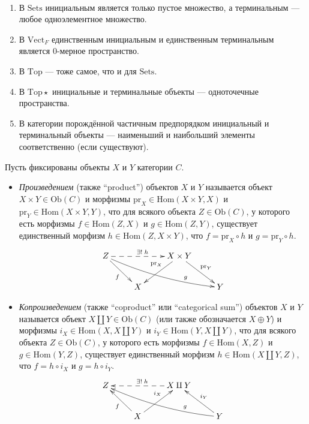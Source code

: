 \documentclass[12pt,a4paper]{article}
\newcommand{\Hom}{\mathrm{Hom}}
\newcommand{\Ob}{\mathrm{Ob}}
\newcommand{\Sets}{\mathrm{Sets}}
\newcommand{\Vect}{\mathrm{Vect}}
\newcommand{\Top}{\mathrm{Top}}
\newcommand{\Topstar}{\mathrm{Top\star}}
\newcommand{\pr}{\mathrm{pr}}
\begin{document}
    \begin{example}\ 
        \begin{enumerate}
            \item В $\Sets$ инициальным является только пустое множество, а терминальным --- любое одноэлементное множество.
            \item В $\Vect_F$ единственным инициальным и единственным терминальным является $0$-мерное пространство.
            \item В $\Top$ --- тоже самое, что и для $\Sets$.
            \item В $\Topstar$ инициальные и терминальные объекты --- одноточечные пространства.
            \item В категории порождённой частичным предпорядком инициальный и терминальный объекты --- наименьший и наибольший элементы соответственно (если существуют).
        \end{enumerate}
    \end{example}

    \begin{definition}
        Пусть фиксированы объекты $X$ и $Y$ категории $C$.
        \begin{itemize}
            \item \emph{Произведением} (также ``product'') объектов $X$ и $Y$ называется объект $X \times Y \in \Ob(C)$ и морфизмы $\pr_X \in \Hom(X \times Y, X)$ и $\pr_Y \in \Hom(X \times Y, Y)$, что для всякого объекта $Z \in \Ob(C)$, у которого есть морфизмы $f \in \Hom(Z, X)$ и $g \in \Hom(Z, Y)$, существует единственный морфизм $h \in \Hom(Z, X \times Y)$, что $f = \pr_X \circ h$ и $g = \pr_Y \circ h$.
                \[
                    \xymatrix{
                        Z \ar[rd]_{f} \ar@{-->}[rr]^{\exists!\; h} \ar@/_/[rrrd]^(.7){g} && X \times Y \ar[dl]_(0.4){\pr_X} \ar[dr]^{\pr_Y}\\
                        & X && Y
                    }
                \]
            \item \emph{Копроизведением} (также ``coproduct'' или ``categorical sum'') объектов $X$ и $Y$ называется объект $X \amalg Y \in \Ob(C)$ (или также обозначается $X \oplus Y$) и морфизмы $i_X \in \Hom(X, X \amalg Y)$ и $i_Y \in \Hom(Y, X \amalg Y)$, что для всякого объекта $Z \in \Ob(C)$, у которого есть морфизмы $f \in \Hom(X, Z)$ и $g \in \Hom(Y, Z)$, существует единственный морфизм $h \in \Hom(X \amalg Y, Z)$, что $f = h \circ i_X$ и $g = h \circ i_Y$.
                \[
                    \xymatrix{
                        Z && X \amalg Y \ar@{-->}[ll]_{\exists!\; h}\\
                        & X \ar[lu]^{f} \ar[ur]^(0.6){i_X} && Y \ar@/^/[lllu]_(.3){g} \ar[ul]_{i_Y}
                    }
                \]
        \end{itemize}
    \end{definition}
\end{document}
